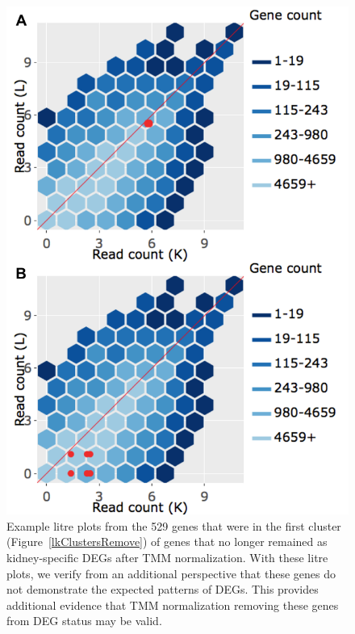 \documentclass{article}
\begin{document}
  \null
  \begin{figure}[t!]
  \centerline{\includegraphics[width=0.7\columnwidth]{../MakeFigures/Dashboards/litreClusterRemove/litreClusterRemove.jpg}}
  \caption{Example litre plots from the 529 genes that were in the first cluster (Figure~\ref{lkClustersRemove}) of genes that no longer remained as kidney-specific DEGs after TMM normalization. With these litre plots, we verify from an additional perspective that these genes do not demonstrate the expected patterns of DEGs. This provides additional evidence that TMM normalization removing these genes from DEG status may be valid.
  \label{litreClusterRemove}}
  \end{figure}
  
\end{document}

